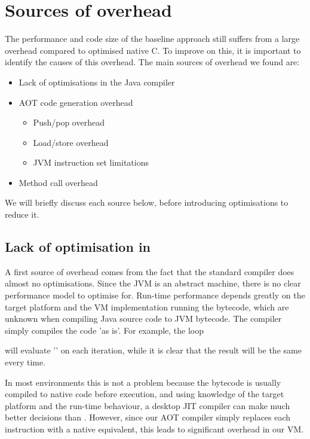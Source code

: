 \section{Sources of overhead}
The performance and code size of the baseline approach still suffers from a large overhead compared to optimised native C. To improve on this, it is important to identify the causes of this overhead. The main sources of overhead we found are:
\begin{itemize}
	\item Lack of optimisations in the Java compiler
	\item AOT code generation overhead
	\begin{itemize}
		\item Push/pop overhead
		\item Load/store overhead
		\item JVM instruction set limitations
	\end{itemize}
	\item Method call overhead
\end{itemize}

We will briefly discuss each source below, before introducing optimisations to reduce it.

\subsection{Lack of optimisation in }
A first source of overhead comes from the fact that the standard  compiler does almost no optimisations.  Since the JVM is an abstract machine, there is no clear performance model to optimise for. Run-time performance depends greatly on the target platform and the VM implementation running the bytecode, which are unknown when compiling Java source code to JVM bytecode. The  compiler simply compiles the code 'as is'. For example, the loop 

\centerline{}

\noindent will evaluate '' on each iteration, while it is clear that the result will be the same every time.

In most environments this is not a problem because the bytecode is usually compiled to native code before execution, and using knowledge of the target platform and the run-time behaviour, a desktop JIT compiler can make much better decisions than . However, since our AOT compiler simply replaces each instruction with a native equivalent, this leads to significant overhead in our VM.

